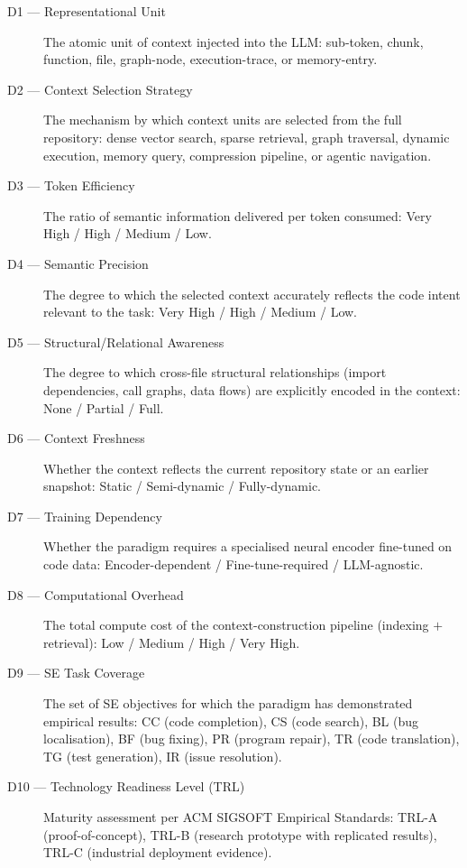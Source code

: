 \documentclass[acmsmall,screen,review]{acmart}
\begin{document}
\begin{description}
  \item[D1 — Representational Unit] The atomic unit of context
    injected into the LLM: sub-token, chunk, function, file, graph-node,
    execution-trace, or memory-entry.
  \item[D2 — Context Selection Strategy] The mechanism by which context
    units are selected from the full repository: dense vector search,
    sparse retrieval, graph traversal, dynamic execution, memory query,
    compression pipeline, or agentic navigation.
  \item[D3 — Token Efficiency] The ratio of semantic information
    delivered per token consumed: Very High / High / Medium / Low.
  \item[D4 — Semantic Precision] The degree to which the selected
    context accurately reflects the code intent relevant to the task:
    Very High / High / Medium / Low.
  \item[D5 — Structural/Relational Awareness] The degree to which
    cross-file structural relationships (import dependencies, call
    graphs, data flows) are explicitly encoded in the context:
    None / Partial / Full.
  \item[D6 — Context Freshness] Whether the context reflects the
    current repository state or an earlier snapshot:
    Static / Semi-dynamic / Fully-dynamic.
  \item[D7 — Training Dependency] Whether the paradigm requires a
    specialised neural encoder fine-tuned on code data:
    Encoder-dependent / Fine-tune-required / LLM-agnostic.
  \item[D8 — Computational Overhead] The total compute cost of the
    context-construction pipeline (indexing $+$ retrieval): Low /
    Medium / High / Very High.
  \item[D9 — SE Task Coverage] The set of SE objectives for which the
    paradigm has demonstrated empirical results: CC (code completion),
    CS (code search), BL (bug localisation), BF (bug fixing), PR
    (program repair), TR (code translation), TG (test generation), IR
    (issue resolution).
  \item[D10 — Technology Readiness Level (TRL)] Maturity assessment
    per ACM SIGSOFT Empirical Standards: TRL-A (proof-of-concept),
    TRL-B (research prototype with replicated results), TRL-C
    (industrial deployment evidence).
\end{description}

\end{document}

